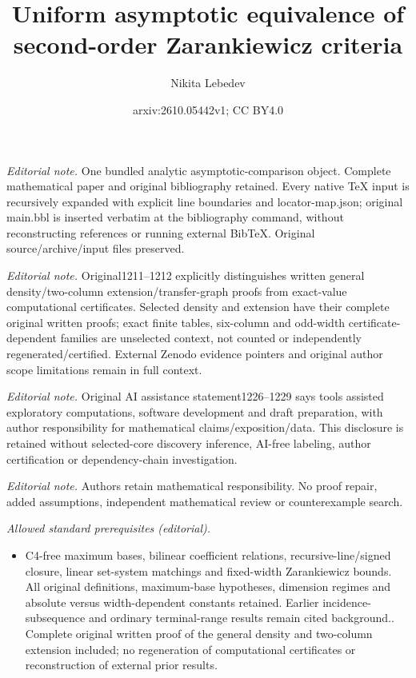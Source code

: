 \documentclass[11pt,a4paper]{article}
\title{Uniform asymptotic equivalence of second-order Zarankiewicz criteria}
\author{Nikita Lebedev}
\date{arxiv:2610.05442v1; CC BY4.0}
\theoremstyle{definition}
\begin{document}
\maketitle
\noindent\textit{Editorial note.} One bundled analytic asymptotic-comparison object. Complete mathematical paper and original bibliography retained. Every native TeX input is recursively expanded with explicit line boundaries and locator-map.json; original main.bbl is inserted verbatim at the bibliography command, without reconstructing references or running external BibTeX. Original source/archive/input files preserved.\par\medskip
\noindent\textit{Editorial note.} Original1211--1212 explicitly distinguishes written general density/two-column extension/transfer-graph proofs from exact-value computational certificates. Selected density and extension have their complete original written proofs; exact finite tables, six-column and odd-width certificate-dependent families are unselected context, not counted or independently regenerated/certified. External Zenodo evidence pointers and original author scope limitations remain in full context.\par\medskip
\noindent\textit{Editorial note.} Original AI assistance statement1226--1229 says tools assisted exploratory computations, software development and draft preparation, with author responsibility for mathematical claims/exposition/data. This disclosure is retained without selected-core discovery inference, AI-free labeling, author certification or dependency-chain investigation.\par\medskip
\noindent\textit{Editorial note.} Authors retain mathematical responsibility. No proof repair, added assumptions, independent mathematical review or counterexample search.\par\medskip
\noindent\textit{Allowed standard prerequisites (editorial).}\begin{itemize}
\item C4-free maximum bases, bilinear coefficient relations, recursive-line/signed closure, linear set-system matchings and fixed-width Zarankiewicz bounds. All original definitions, maximum-base hypotheses, dimension regimes and absolute versus width-dependent constants retained. Earlier incidence-subsequence and ordinary terminal-range results remain cited background.. Complete original written proof of the general density and two-column extension included; no regeneration of computational certificates or reconstruction of external prior results.
\end{itemize}\medskip
\end{document}
